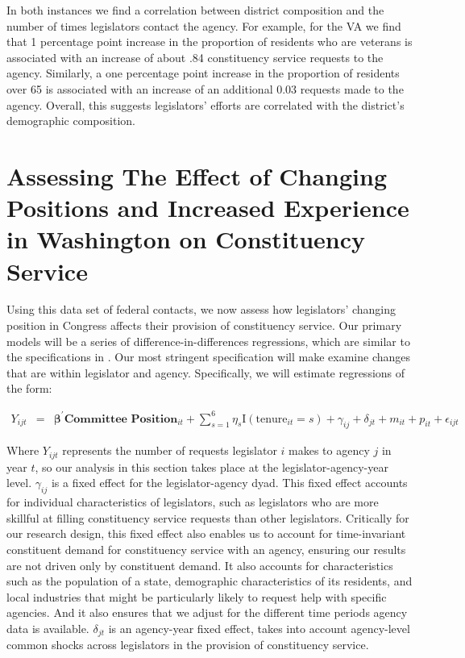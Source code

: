 \documentclass{article}
\begin{document}
In both instances we find a correlation between district composition and the number of times legislators contact the agency.  For example, for the VA we find that 1 percentage point increase in the proportion of residents who are veterans is associated with an increase of about .84 constituency service requests to the agency. Similarly, a one percentage point increase in the proportion of residents over 65 is associated with an increase of an additional 0.03 requests made to the agency. Overall, this suggests legislators' efforts are correlated with the district's demographic composition.  


\section{Assessing The Effect of Changing Positions and Increased Experience in Washington on Constituency Service}\label{s:prestige} 

Using this data set of federal contacts, we now assess how legislators' changing position in Congress affects their provision of constituency service.  Our primary models will be a series of difference-in-differences regressions, which are similar to the specifications in \cite{BerryFowler2016}.  Our most stringent specification will make examine changes that are within legislator and agency.  Specifically, we will estimate regressions of the form: 

\begin{eqnarray}
Y_{ijt} & = & \boldsymbol{\beta}^{'} \textbf{Committee Position}_{it}   + \sum_{s = 1}^{6} \eta_{s} \text{I}\left(\text{tenure}_{it} = s\right) + \gamma_{ij} +  \delta_{jt} +  m_{it} + p_{it} +  \epsilon_{ijt} \label{e:diff1}
\end{eqnarray}

Where $Y_{ijt}$ represents the number of requests legislator $i$ makes to agency $j$ in year $t$, so our analysis in this section takes place at the legislator-agency-year level.  $\gamma_{ij}$ is a fixed effect for the legislator-agency dyad.  This fixed effect accounts for individual characteristics of legislators, such as legislators who are more skillful at filling constituency service requests than other legislators.  Critically for our research design, this fixed effect also enables us to account for time-invariant constituent demand for constituency service with an agency, ensuring our results are not driven only by constituent demand.  It also accounts for characteristics such as the population of a state, demographic characteristics of its residents, and local industries that might be particularly likely to request help with specific agencies.  And it also ensures that we adjust for the different time periods agency data is available.  $\delta_{jt}$ is an agency-year fixed effect, takes into account agency-level common shocks across legislators in the provision of constituency service.    
\end{document}
